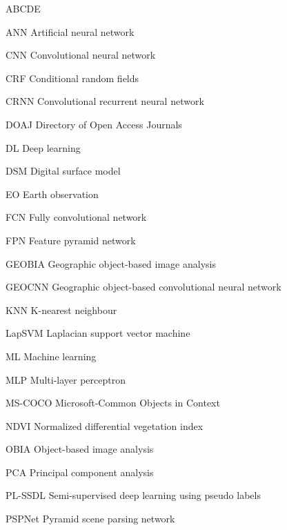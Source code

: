 
\begin{seznamzkratek}{ABCDE}

	      {ANN}
	      {Artificial neural network}

	      {CNN}
	      {Convolutional neural network}

	      {CRF}
	      {Conditional random fields}

	      {CRNN}
	      {Convolutional recurrent neural network}

	      {DOAJ}
	      {Directory of Open Access Journals}

	      {DL}
	      {Deep learning}

	      {DSM}
	      {Digital surface model}

	      {EO}
	      {Earth observation}

	      {FCN}
	      {Fully convolutional network}

	      {FPN}
	      {Feature pyramid network}

	      {GEOBIA}
	      {Geographic object-based image analysis}

	      {GEOCNN}
	      {Geographic object-based convolutional neural network}

	      {KNN}
	      {K-nearest neighbour}

	      {LapSVM}
	      {Laplacian support vector machine}

	      {ML}
	      {Machine learning}

	      {MLP}
	      {Multi-layer perceptron}

	      {MS-COCO}
	      {Microsoft-Common Objects in Context}

	      {NDVI}
	      {Normalized differential vegetation index}

	      {OBIA}
	      {Object-based image analysis}

	      {PCA}
	      {Principal component analysis}

	      {PL-SSDL}
	      {Semi-supervised deep learning using pseudo labels}

	      {PSPNet}
	      {Pyramid scene parsing network}


\end{seznamzkratek}
